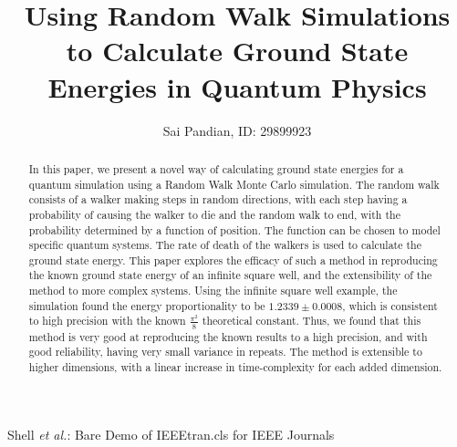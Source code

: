 \documentclass[journal]{IEEEtran}
\begin{document}
\title{Using Random Walk Simulations to Calculate Ground State Energies in
  Quantum Physics}

\author{Sai Pandian, ID: 29899923}%
        
{Shell \MakeLowercase{\textit{et al.}}: Bare Demo of IEEEtran.cls for IEEE Journals}

\maketitle

\begin{abstract}
  In this paper, we present a novel way of calculating ground state energies for
  a quantum simulation using a Random Walk Monte Carlo simulation. The random
  walk consists of a walker making steps in random directions, with each step
  having a probability of causing the walker to die and the random walk to end,
  with the probability determined by a function of position. The function can be
  chosen to model specific quantum systems. The rate of death of the walkers is
  used to calculate the ground state energy. This paper explores the efficacy of
  such a method in reproducing the known ground state energy of an infinite
  square well, and the extensibility of the method to more complex
  systems. Using the infinite square well example, the simulation found the
  energy proportionality to be $1.2339 \pm 0.0008$, which is consistent to high
  precision with the known $\frac{\pi^2}{8}$ theoretical constant. Thus, we found
  that this method is very good at reproducing the known results to a high
  precision, and with good reliability, having very small variance in
  repeats. The method is extensible to higher dimensions, with a linear increase
  in time-complexity for each added dimension.
\end{abstract}
\end{document}
